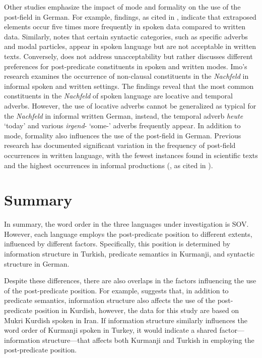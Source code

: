 \largerpage
Other studies emphasize the impact of mode and formality on the use of the post-field in German. For example,  findings, as cited in \citet{Erdal1999}, indicate that extraposed elements occur five times more frequently in spoken data compared to written data. Similarly, \citet{Proske2015} notes that certain syntactic categories, such as specific adverbs and modal particles, appear in spoken language but are not acceptable in written texts. Conversely, \citet{Imo2015} does not address unacceptability but rather discusses different preferences for post-predicate constituents in spoken and written modes. Imo's research examines the occurrence of non-clausal constituents in the \textit{Nachfeld} in informal spoken and written settings. The findings reveal that the most common constituents in the \textit{Nachfeld} of spoken language are locative and temporal adverbs. However, the use of locative adverbs cannot be generalized as typical for the \textit{Nachfeld} in informal written German, instead, the temporal adverb \textit{heute} ‘today’ and various \textit{irgend}- ‘some-’ adverbs frequently appear. In addition to mode, formality also influences the use of the post-field in German. Previous research has documented significant variation in the frequency of post-field occurrences in written language, with the fewest instances found in scientific texts and the highest occurrences in informal productions (\citealt{Roelcke1997}, as cited in \citealt{Tsehaye2023}).

\section{Summary} \label{sec:key:3.6}

In summary, the word order in the three languages under investigation is SOV. However, each language employs the post-predicate position to different extents, influenced by different factors. Specifically, this position is determined by information structure in Turkish, predicate semantics in Kurmanji, and syntactic structure in German.

Despite these differences, there are also overlaps in the factors influencing the use of the post-predicate position. For example, \citet{Asadpour2021} suggests that, in addition to predicate semantics, information structure also affects the use of the post-predicate position in Kurdish, however, the data for this study are based on Mukri Kurdish spoken in Iran. If information structure similarly influences the word order of Kurmanji spoken in Turkey, it would indicate a shared factor—information structure—that affects both Kurmanji and Turkish in employing the post-predicate position.

